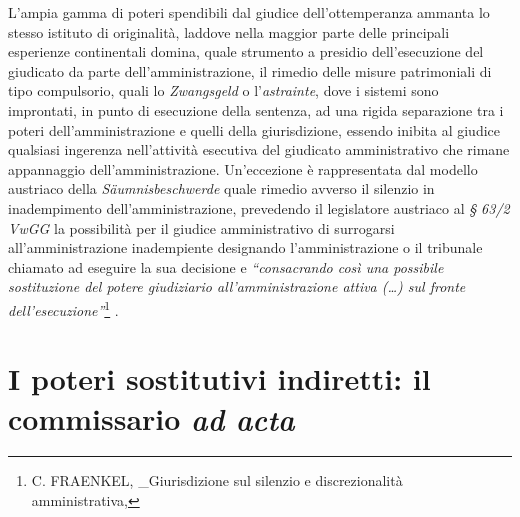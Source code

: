 \documentclass[12pt,it,a4paper,]{report}
\begin{document}
L'ampia gamma di poteri spendibili dal giudice dell'ottemperanza ammanta
lo stesso istituto di originalità, laddove nella maggior parte delle
principali esperienze continentali domina, quale strumento a presidio
dell'esecuzione del giudicato da parte dell'amministrazione, il rimedio
delle misure patrimoniali di tipo compulsorio, quali lo
\emph{Zwangsgeld} o l'\emph{astrainte}, dove i sistemi sono improntati,
in punto di esecuzione della sentenza, ad una rigida separazione tra i
poteri dell'amministrazione e quelli della giurisdizione, essendo
inibita al giudice qualsiasi ingerenza nell'attività esecutiva del
giudicato amministrativo che rimane appannaggio dell'amministrazione.
Un'eccezione è rappresentata dal modello austriaco della
\emph{Säumnisbeschwerde} quale rimedio avverso il silenzio in
inadempimento dell'amministrazione, prevedendo il legislatore austriaco
al \emph{§ 63/2 VwGG} la possibilità per il giudice amministrativo di
surrogarsi all'amministrazione inadempiente designando l'amministrazione
o il tribunale chiamato ad eseguire la sua decisione e
\emph{``consacrando così una possibile sostituzione del potere
giudiziario all'amministrazione attiva (\ldots) sul fronte
dell'esecuzione''}\footnote{C. FRAENKEL, \_Giurisdizione sul silenzio e
  discrezionalità amministrativa,} .

\hypertarget{i-poteri-sostitutivi-indiretti-il-commissario-ad-acta}{%
\section{\texorpdfstring{I poteri sostitutivi indiretti: il commissario
\emph{ad
acta}}{I poteri sostitutivi indiretti: il commissario ad acta}}\label{i-poteri-sostitutivi-indiretti-il-commissario-ad-acta}}
\end{document}
